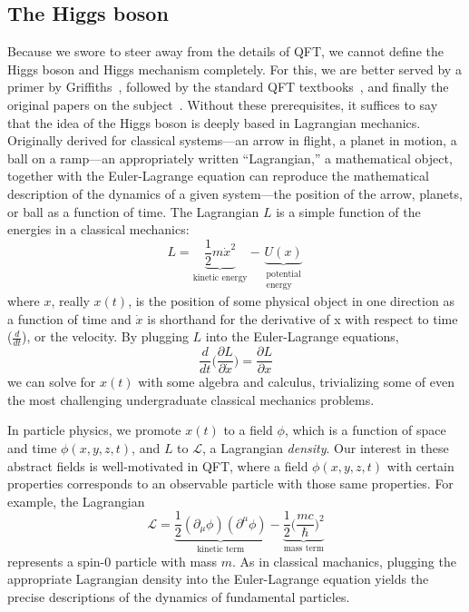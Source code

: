 \subsection{The Higgs boson}\label{sec:higgs}
Because we swore to steer away from the details of QFT, we cannot define the Higgs boson and Higgs mechanism completely. 
For this, we are better served by a primer by Griffiths~\cite{GriffithsParticle}, followed by the standard QFT textbooks~\cite{SrednickiQFT, PeskinSchroederQFT}, and finally the original papers on the subject~\cite{EnglertBroutPRL, HiggsPhysLett, HiggsPRL, GuralnikHagenKibblePRL}. 
Without these prerequisites, it suffices to say that the idea of the Higgs boson is deeply based in Lagrangian mechanics. 
Originally derived for classical systems---an arrow in flight, a planet in motion, a ball on a ramp---an appropriately written ``Lagrangian,'' a mathematical object, together with the Euler-Lagrange equation can reproduce the mathematical description of the dynamics of a given system---the position of the arrow, planets, or ball as a function of time. 
The Lagrangian $L$ is a simple function of the energies in a classical mechanics:
\begin{equation}
    L = \underbrace{\frac{1}{2}m\dot{x}^2}_\text{kinetic energy} - \underbrace{U(x)}_{\substack{\text{potential} \\ \text{energy}}}
\end{equation}
where $x$, really $x(t)$, is the position of some physical object in one direction as a function of time and $\dot{x}$ is shorthand for the derivative of x with respect to time ($\frac{d}{dt}$), or the velocity. 
By plugging $L$ into the Euler-Lagrange equations, 
\begin{equation}
    \frac{d}{dt}\bigg(\frac{\partial L}{\partial\dot{x}}\bigg) = \frac{\partial L}{\partial x}
\end{equation}
we can solve for $x(t)$ with some algebra and calculus, trivializing some of even the most challenging undergraduate classical mechanics problems. 

In particle physics, we promote $x(t)$ to a field\footnotemark{} $\phi$, which is a function of space and time $\phi(x, y, z, t)$, and $L$ to $\mathcal{L}$, a Lagrangian \textit{density}.
Our interest in these abstract fields is well-motivated in QFT, where a field $\phi(x,y,z,t)$ with certain properties corresponds to an observable particle with those same properties. 
For example, the Lagrangian 
\begin{equation}
    \mathcal{L} = \underbrace{\frac{1}{2}(\partial_\mu\phi)(\partial^\mu\phi)}_{\text{kinetic term}} - \underbrace{\frac{1}{2}\big(\frac{mc}{\hbar}\big)^2}_\text{mass term}
\end{equation}
represents a spin-0 particle with mass $m$. 
As in classical machanics, plugging the appropriate Lagrangian density into the Euler-Lagrange equation yields the precise descriptions of the dynamics of fundamental particles. 


